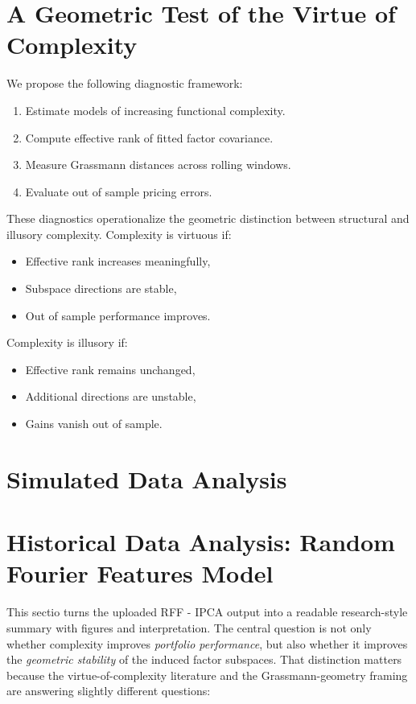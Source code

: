 \documentclass[twoside,11pt,letter]{article}
\begin{document}
\section{A Geometric Test of the Virtue of Complexity}

We propose the following diagnostic framework:
\begin{enumerate}[label=(\roman*)]
\item Estimate models of increasing functional complexity.
\item Compute effective rank of fitted factor covariance.
\item Measure Grassmann distances across rolling windows.
\item Evaluate out of sample pricing errors.
\end{enumerate}

These diagnostics operationalize the geometric distinction between structural and illusory complexity. Complexity is virtuous if:
\begin{itemize}
\item Effective rank increases meaningfully,
\item Subspace directions are stable,
\item Out of sample performance improves.
\end{itemize}
Complexity is illusory if:
\begin{itemize}
\item Effective rank remains unchanged,
\item Additional directions are unstable,
\item Gains vanish out of sample.
\end{itemize}

\section{Simulated Data Analysis}


\section{Historical Data Analysis: Random Fourier Features Model}

This sectio turns the uploaded RFF - IPCA output into a readable research-style summary with figures and interpretation. The central question is not only whether complexity improves \emph{portfolio performance}, but also whether it improves the \emph{geometric stability} of the induced factor subspaces. That distinction matters because the virtue-of-complexity literature and the Grassmann-geometry framing are answering slightly different questions:
\end{document}
